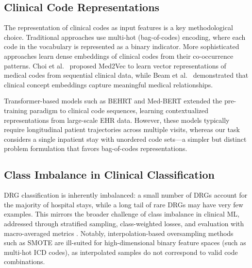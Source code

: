 \subsection{Clinical Code Representations}

The representation of clinical codes as input features is a key methodological choice. Traditional approaches use multi-hot (bag-of-codes) encoding, where each code in the vocabulary is represented as a binary indicator. More sophisticated approaches learn dense embeddings of clinical codes from their co-occurrence patterns. Choi et al.\ \cite{choi2016med2vec} proposed Med2Vec to learn vector representations of medical codes from sequential clinical data, while Beam et al.\ \cite{beam2019clinical} demonstrated that clinical concept embeddings capture meaningful medical relationships.

Transformer-based models such as BEHRT \cite{li2020behrt} and Med-BERT \cite{rasmy2021medbert} extended the pre-training paradigm to clinical code sequences, learning contextualized representations from large-scale EHR data. However, these models typically require longitudinal patient trajectories across multiple visits, whereas our task considers a single inpatient stay with unordered code sets---a simpler but distinct problem formulation that favors bag-of-codes representations.

\subsection{Class Imbalance in Clinical Classification}

DRG classification is inherently imbalanced: a small number of DRGs account for the majority of hospital stays, while a long tail of rare DRGs may have very few examples. This mirrors the broader challenge of class imbalance in clinical ML, addressed through stratified sampling, class-weighted losses, and evaluation with macro-averaged metrics \cite{haixiang2017imbalanced, johnson2019survey}. Notably, interpolation-based oversampling methods such as SMOTE \cite{chawla2002smote} are ill-suited for high-dimensional binary feature spaces (such as multi-hot ICD codes), as interpolated samples do not correspond to valid code combinations.
